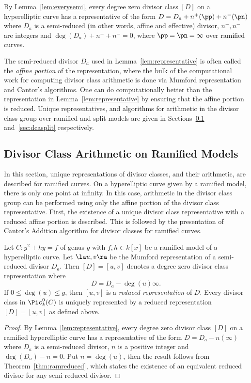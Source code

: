 \bl\label{lem:representative}
By Lemma~\ref{lem:everysemi}, every degree zero divisor class $[D]$ on a
hyperelliptic curve has a representative of the form $D = D_a + n^+(\pp) +
n^-(\pn)$ where $D_a$ is a semi-reduced (in other words, affine and effective)
divisor, $n^+,n^-$ are integers and $\deg(D_a) + n^+ + n^- = 0$, where $\pp =
\pn = \infty$ over ramified curves. 
\el

The semi-reduced divisor $D_a$ used in Lemma~\ref{lem:representative} is often
called the \emph{affine portion} of the representation, where the bulk of the
computational work for computing divisor class arithmetic is done via Mumford
representation and Cantor's algorithms. One can do computationally better than
the representation in Lemma~\ref{lem:representative} by ensuring that the affine
portion is reduced. Unique representatives, and algorithms for arithmetic in the
divisor class group over ramified and split models are given in
Sections~\ref{sec:dcaram} and~\ref{sec:dcasplit} respectively.

\subsection{Divisor Class Arithmetic on Ramified Models}\label{sec:dcaram}
In this section, unique representations of divisor classes, and their arithmetic,
are described for ramified curves. On a hyperelliptic curve given by a ramified
model, there is only one point at infinity. In this case, arithmetic in the
divisor class group can be performed using only the affine portion of the divisor
class representative. First, the existence of a unique divisor class
representative with a reduced affine portion is described. This is followed by the
presentation of Cantor's Addition algorithm for divisor classes for ramified
curves.

\bt\label{thm:ramreducedrep} Let $C : y^2 + hy = f$ of genus $g$ with $f,h \in
k[x]$ be a ramified model of a hyperelliptic curve. Let $\la u,v \ra$ be the
Mumford representation of a semi-reduced divisor $D_a$. Then $[D]=[u,v]$ denotes
a degree zero divisor class representation where $$D = D_a - \deg(u)\infty.$$ If
$0 \leq \deg(u) \leq g$, then $[u,v]$ is a \emph{reduced representation} of $D$.
Every divisor class in $\Pic^0_k(C)$ is uniquely represented by a reduced
representation $[D] = [u,v]$ as defined above.
\begin{proof}
By Lemma~\ref{lem:representative}, every degree zero divisor class $[D]$ on a
ramified hyperelliptic curve has a representative of the form $D = D_a -
n(\infty)$ where $D_a$ is a semi-reduced divisor, $n$ is a positive integer and
$\deg(D_a) - n = 0$. Put $n = \deg(u)$, then the result follows from
Theorem~\ref{thm:ramreduced}, which states the existence of an equivalent reduced
divisor for any semi-reduced divisor.
\end{proof}
\et


